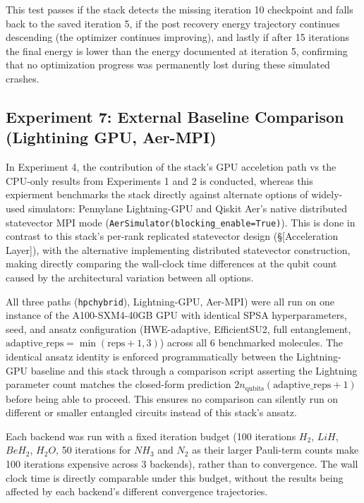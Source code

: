 This test passes if the stack detects the missing iteration 10 checkpoint and falls back to the saved iteration 5, if 
the post recovery energy trajectory continues descending (the optimizer continues improving), and lastly if  after 15 iterations the final energy
is lower than the energy documented at iteration 5, confirming that no optimization progress was permanently lost during these simulated crashes.



\subsection{Experiment 7: External Baseline Comparison (Lightining GPU, Aer-MPI)}
In Experiment 4, the contribution of the stack's GPU acceletion path vs the CPU-only results from Experiments 1 and 2 is conducted, whereas this expierment 
benchmarks the stack directly against alternate options of widely-used simulators: Pennylane Lightning-GPU and Qiskit Aer's native distributed statevector MPI mode (\texttt{AerSimulator(blocking_enable=True)}). 
This is done in contrast to this stack's per-rank replicated statevector design (\S[Acceleration Layer]), with the alternative implementing distributed statevector construction, making 
directly comparing the wall-clock time differences at the qubit count caused by the architectural variation between all options. 

All three paths (\texttt{hpchybrid}), Lightning-GPU, Aer-MPI) were all run on one instance of the A100-SXM4-40GB GPU with identical SPSA hyperparameters, seed, and ansatz configuration (HWE-adaptive, EfficientSU2, full entanglement, $\text{adaptive_reps}=\min(\text{reps}+1, 3)$)
across all 6 benchmarked molecules. The identical ansatz identity is enforced programmatically between the Lightning-GPU baseline and this stack through a comparison script asserting the Lightning parameter count 
matches the closed-form prediction $2 n_{\text{qubits}} (\text{adaptive_reps}+1)$ before being able to proceed. This ensures no comparison can silently run on different or smaller entangled circuits instead of this stack's ansatz. 

Each backend was run with a fixed iteration budget (100 iterations $H_2$, $LiH$, $BeH_2$, $H_2O$, 50 iterations for $NH_3$ and $N_2$ as their larger Pauli-term counts make 100 iterations expensive across 3 backends), rather than to convergence. %
The wall clock time is directly comparable under this budget, without the results being affected by each backend's different convergence trajectories.  

